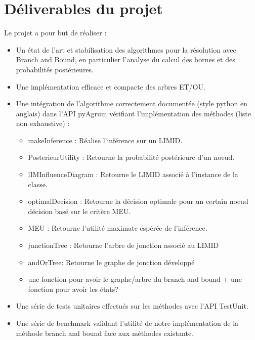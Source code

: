 \documentclass[12pt]{article}
\begin{document}
\section{Déliverables du projet}
Le projet a pour but de réaliser :
\begin{itemize}
\item Un état de l'art et stabilisation des algorithmes pour la résolution avec Branch and Bound, en particulier l'analyse du calcul des bornes et des probabilités postérieures.
\item Une implémentation efficace et compacte des arbres ET/OU.
\item Une intégration de l'algorithme correctement documentée (style python en anglais) dans l'API pyAgrum vérifiant l'implémentation des méthodes (liste non exhaustive) :
\begin{itemize}
    \item makeInference : Réalise l'inférence sur un LIMID.
    \item PosterieurUtility : Retourne la probabilité postérieure d'un noeud.
    \item lIMInfluenceDiagram : Retourne le LIMID associé à l'instance de la classe.
    \item optimalDecision : Retourne la décision optimale pour un certain noeud décision basé sur le critère MEU.
    \item MEU : Retourne l'utilité maximate espérée de l'inférence.
    \item junctionTree : Retourne l'arbre de jonction associé au LIMID
    \item andOrTree: Retourne le graphe de jonction développé
    \item une fonction pour avoir le graphe/arbre du branch and bound + une fonction pour avoir les états?
\end{itemize}
\item Une série de tests unitaires effectués sur les méthodes avec l'API TestUnit.
\item Une série de benchmark validant l'utilité de notre implémentation de la méthode branch and bound face aux méthodes existante.
\end{itemize}


 
 

\end{document}
